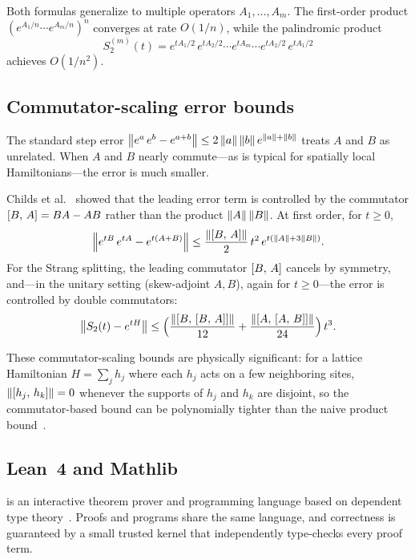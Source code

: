 Both formulas generalize to multiple operators $A_1, \ldots, A_m$.
The first-order product $(e^{A_1/n} \cdots e^{A_m/n})^n$ converges at rate
$O(1/n)$, while the palindromic product
\[
  S_2^{(m)}(t) = e^{tA_1/2}\,e^{tA_2/2}\cdots e^{tA_m}\cdots e^{tA_2/2}\,e^{tA_1/2}
\]
achieves $O(1/n^2)$.

\subsection{Commutator-scaling error bounds}
\label{sec:bg-commutator}

The standard step error $\left\|e^a\,e^b - e^{a+b}\right\| \le 2\left\|a\right\|\left\|b\right\|e^{\left\|a\right\|+\left\|b\right\|}$
treats $A$ and $B$ as unrelated. When $A$ and $B$ nearly commute---as is
typical for spatially local Hamiltonians---the error is much smaller.

Childs et al.~\cite{childsTheoryTrotterError2021} showed that the leading error term is
controlled by the commutator $[B,\,A] = BA - AB$ rather than the product
$\left\|A\right\|\left\|B\right\|$. At first order, for $t \ge 0$,
\begin{equation}\label{eq:comm-scaling-bg}
  \left\|e^{tB}\,e^{tA} - e^{t(A+B)}\right\|
    \le \frac{\left\|[B,\,A]\right\|}{2}\,t^2\,e^{t(\left\|A\right\|+3\left\|B\right\|)}.
\end{equation}
For the Strang splitting, the leading commutator $[B,\,A]$ cancels by
symmetry, and---in the unitary setting (skew-adjoint $A, B$), again for
$t \ge 0$---the error is controlled by double commutators:
\begin{equation}\label{eq:strang-comm-bg}
  \left\|S_2(t) - e^{tH}\right\|
    \le \Bigl(\frac{\left\|[B,\,[B,\,A]]\right\|}{12}
      + \frac{\left\|[A,\,[A,\,B]]\right\|}{24}\Bigr)\,t^3.
\end{equation}

These commutator-scaling bounds are physically significant: for a lattice
Hamiltonian $H = \sum_j h_j$ where each $h_j$ acts on a few neighboring sites,
$\left\|[h_j,\,h_k]\right\| = 0$ whenever the supports of $h_j$ and $h_k$ are
disjoint, so the commutator-based bound can be polynomially tighter than the
naive product bound~\cite{childsTheoryTrotterError2021}.

\subsection{Lean~4 and Mathlib}
\label{sec:bg-lean}

\Lean is an interactive theorem prover and programming language based on
dependent type theory~\cite{demoura2021lean4}. Proofs and programs share the
same language, and correctness is guaranteed by a small trusted kernel that
independently type-checks every proof term.

